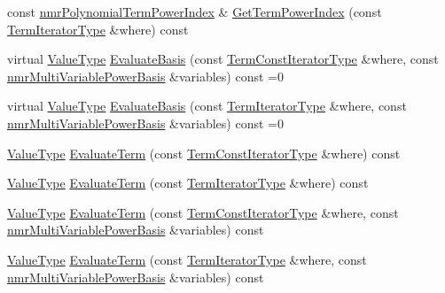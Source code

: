 \begin{DoxyCompactItemize}
\item 
const \hyperlink{classnmr_polynomial_term_power_index}{nmr\-Polynomial\-Term\-Power\-Index} \& \hyperlink{classnmr_polynomial_container_a2143e3ffbe827d4ec643b9fa98da1147}{Get\-Term\-Power\-Index} (const \hyperlink{classnmr_polynomial_container_a276e57445d038e8a16462f47b85719a3}{Term\-Iterator\-Type} \&where) const 
\item 
virtual \hyperlink{classnmr_polynomial_base_a72f0bc16b225e4708bcf15a77ba206e3}{Value\-Type} \hyperlink{classnmr_polynomial_container_ace5c179e6031133fed7602405f0eb56e}{Evaluate\-Basis} (const \hyperlink{classnmr_polynomial_container_aba8d31506ab6a487fdc4fe2815469442}{Term\-Const\-Iterator\-Type} \&where, const \hyperlink{classnmr_multi_variable_power_basis}{nmr\-Multi\-Variable\-Power\-Basis} \&variables) const =0
\item 
virtual \hyperlink{classnmr_polynomial_base_a72f0bc16b225e4708bcf15a77ba206e3}{Value\-Type} \hyperlink{classnmr_polynomial_container_a36281b8ecdc51dfcdac7a373c01ba234}{Evaluate\-Basis} (const \hyperlink{classnmr_polynomial_container_a276e57445d038e8a16462f47b85719a3}{Term\-Iterator\-Type} \&where, const \hyperlink{classnmr_multi_variable_power_basis}{nmr\-Multi\-Variable\-Power\-Basis} \&variables) const =0
\item 
\hyperlink{classnmr_polynomial_base_a72f0bc16b225e4708bcf15a77ba206e3}{Value\-Type} \hyperlink{classnmr_polynomial_container_a8f83a6642b01d0d3ce1df25f9e7c8fc5}{Evaluate\-Term} (const \hyperlink{classnmr_polynomial_container_aba8d31506ab6a487fdc4fe2815469442}{Term\-Const\-Iterator\-Type} \&where) const 
\item 
\hyperlink{classnmr_polynomial_base_a72f0bc16b225e4708bcf15a77ba206e3}{Value\-Type} \hyperlink{classnmr_polynomial_container_abeea4f2120d30716e094613b8cf7ce9e}{Evaluate\-Term} (const \hyperlink{classnmr_polynomial_container_a276e57445d038e8a16462f47b85719a3}{Term\-Iterator\-Type} \&where) const 
\item 
\hyperlink{classnmr_polynomial_base_a72f0bc16b225e4708bcf15a77ba206e3}{Value\-Type} \hyperlink{classnmr_polynomial_container_a35718a7ac77d0753a8ea2f69a3ff0141}{Evaluate\-Term} (const \hyperlink{classnmr_polynomial_container_aba8d31506ab6a487fdc4fe2815469442}{Term\-Const\-Iterator\-Type} \&where, const \hyperlink{classnmr_multi_variable_power_basis}{nmr\-Multi\-Variable\-Power\-Basis} \&variables) const 
\item 
\hyperlink{classnmr_polynomial_base_a72f0bc16b225e4708bcf15a77ba206e3}{Value\-Type} \hyperlink{classnmr_polynomial_container_a75719fb872dc581d1829ef3ea8b2f562}{Evaluate\-Term} (const \hyperlink{classnmr_polynomial_container_a276e57445d038e8a16462f47b85719a3}{Term\-Iterator\-Type} \&where, const \hyperlink{classnmr_multi_variable_power_basis}{nmr\-Multi\-Variable\-Power\-Basis} \&variables) const 

\end{DoxyCompactItemize}
